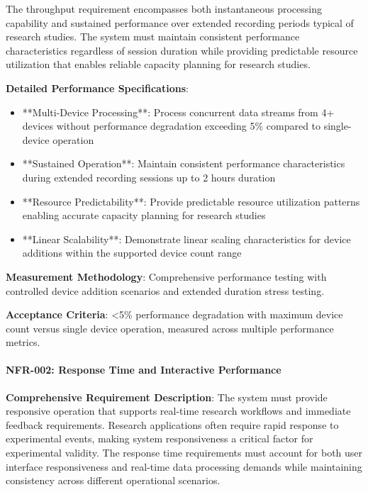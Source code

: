 \documentclass[11pt,a4paper]{report}
\begin{document}
The throughput requirement encompasses both instantaneous processing capability and sustained performance over extended
recording periods typical of research studies. The system must maintain consistent performance characteristics
regardless of session duration while providing predictable resource utilization that enables reliable capacity planning
for research studies.

\textbf{Detailed Performance Specifications}:

\begin{itemize}
\item **Multi-Device Processing**: Process concurrent data streams from 4+ devices without performance degradation exceeding
  5\% compared to single-device operation
\item **Sustained Operation**: Maintain consistent performance characteristics during extended recording sessions up to 2
  hours duration
\item **Resource Predictability**: Provide predictable resource utilization patterns enabling accurate capacity planning for
  research studies
\item **Linear Scalability**: Demonstrate linear scaling characteristics for device additions within the supported device
  count range

\end{itemize}
\textbf{Measurement Methodology}: Comprehensive performance testing with controlled device addition scenarios and extended
duration stress testing.

\textbf{Acceptance Criteria}: <5\% performance degradation with maximum device count versus single device operation, measured
across multiple performance metrics.

\paragraph{NFR-002: Response Time and Interactive Performance}

\textbf{Comprehensive Requirement Description}: The system must provide responsive operation that supports real-time research
workflows and immediate feedback requirements. Research applications often require rapid response to experimental
events, making system responsiveness a critical factor for experimental validity. The response time requirements must
account for both user interface responsiveness and real-time data processing demands while maintaining consistency
across different operational scenarios.
\end{document}
